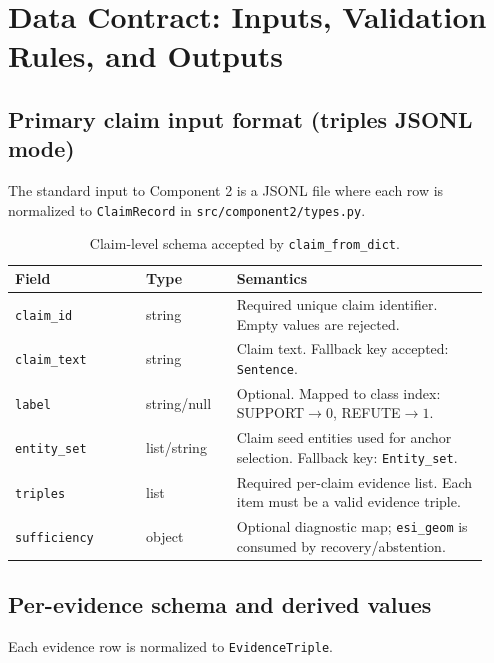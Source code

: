 \section{Data Contract: Inputs, Validation Rules, and Outputs}
\label{sec:contract}

\subsection{Primary claim input format (triples JSONL mode)}
The standard input to Component 2 is a JSONL file where each row is normalized to \texttt{ClaimRecord} in \texttt{src/component2/types.py}.

\begin{table}[H]
\centering
\begin{tabular}{@{}p{0.26\linewidth}p{0.18\linewidth}p{0.50\linewidth}@{}}
\toprule
Field & Type & Semantics \\
\midrule
\texttt{claim\_id} & string & Required unique claim identifier. Empty values are rejected. \\
\texttt{claim\_text} & string & Claim text. Fallback key accepted: \texttt{Sentence}. \\
\texttt{label} & string/null & Optional. Mapped to class index: SUPPORT$\to0$, REFUTE$\to1$. \\
\texttt{entity\_set} & list/string & Claim seed entities used for anchor selection. Fallback key: \texttt{Entity\_set}. \\
\texttt{triples} & list & Required per-claim evidence list. Each item must be a valid evidence triple. \\
\texttt{sufficiency} & object & Optional diagnostic map; \texttt{esi\_geom} is consumed by recovery/abstention. \\
\bottomrule
\end{tabular}
\caption{Claim-level schema accepted by \texttt{claim\_from\_dict}.}
\label{tab:claim-schema}
\end{table}

\subsection{Per-evidence schema and derived values}
Each evidence row is normalized to \texttt{EvidenceTriple}.

